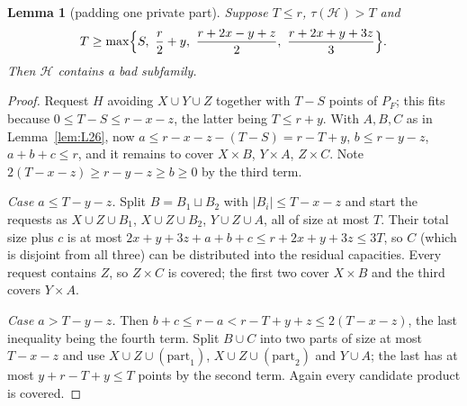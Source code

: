 \documentclass[11pt]{amsart}
\newtheorem{lemma}[theorem]{Lemma}
\theoremstyle{definition}
\theoremstyle{remark}
\newcommand{\cH}{\mathcal H}
\begin{document}
\begin{lemma}[padding one private part]\label{lem:L32}
Suppose $T\le r$, $\tau(\cH)>T$ and
\[
T\ge\max\Bigl\{S,\ \frac r2+y,\ \frac{r+2x-y+z}{2},\ \frac{r+2x+y+3z}{3}\Bigr\}.
\]
Then $\cH$ contains a bad subfamily.
\end{lemma}
\begin{proof}
Request $H$ avoiding $X\cup Y\cup Z$ together with $T-S$ points of $P_F$; this fits because $0\le T-S\le r-x-z$, the latter being $T\le r+y$. With $A,B,C$ as in Lemma~\ref{lem:L26}, now $a\le r-x-z-(T-S)=r-T+y$, $b\le r-y-z$, $a+b+c\le r$, and it remains to cover $X\times B$, $Y\times A$, $Z\times C$. Note $2(T-x-z)\ge r-y-z\ge b\ge0$ by the third term.

\emph{Case $a\le T-y-z$.} Split $B=B_1\sqcup B_2$ with $|B_i|\le T-x-z$ and start the requests as $X\cup Z\cup B_1$, $X\cup Z\cup B_2$, $Y\cup Z\cup A$, all of size at most $T$. Their total size plus $c$ is at most $2x+y+3z+a+b+c\le r+2x+y+3z\le 3T$, so $C$ (which is disjoint from all three) can be distributed into the residual capacities. Every request contains $Z$, so $Z\times C$ is covered; the first two cover $X\times B$ and the third covers $Y\times A$.

\emph{Case $a>T-y-z$.} Then $b+c\le r-a<r-T+y+z\le 2(T-x-z)$, the last inequality being the fourth term. Split $B\cup C$ into two parts of size at most $T-x-z$ and use $X\cup Z\cup(\text{part}_1)$, $X\cup Z\cup(\text{part}_2)$ and $Y\cup A$; the last has at most $y+r-T+y\le T$ points by the second term. Again every candidate product is covered.
\end{proof}
\end{document}
